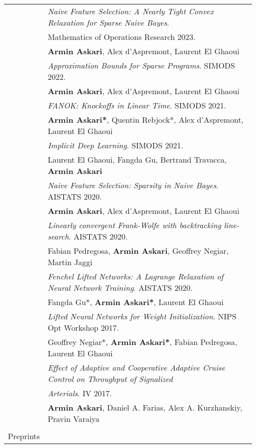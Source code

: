 \documentclass[letterpaper,10pt,oneside]{article}
\begin{document}
\begin{tabular}{@{} l l}
     &  \textit{Naive Feature Selection: A Nearly Tight Convex Relaxation for Sparse Naive Bayes}. \\
     & Mathematics of Operations Research 2023. \\
      & \indent \small{\textbf{Armin Askari}, Alex d'Aspremont, Laurent El Ghaoui}\\
     &  \textit{Approximation Bounds for Sparse Programs}. SIMODS 2022. \\
      & \indent \small{\textbf{Armin Askari}, Alex d'Aspremont, Laurent El Ghaoui}\\
 		&  \textit{FANOK: Knockoffs in Linear Time}. SIMODS  2021. \\
      & \indent \small{\textbf{Armin Askari*}, Quentin Rebjock*, Alex d'Aspremont, Laurent El Ghaoui}\\
       &  \textit{Implicit Deep Learning}. SIMODS  2021. \\
      & \indent \small{Laurent El Ghaoui, Fangda Gu, Bertrand Travacca, \textbf{Armin Askari}}\\
      &  \textit{Naive Feature Selection: Sparsity in Naive Bayes}. AISTATS 2020. \\
      & \indent \small{\textbf{Armin Askari},  Alex d'Aspremont, Laurent El Ghaoui}\\
      &  \textit{Linearly convergent Frank-Wolfe with backtracking line-search}. AISTATS 2020. \\
      & \indent \small{Fabian Pedregosa, \textbf{Armin Askari},  Geoffrey Negiar, Martin Jaggi}\\
            &  \textit{Fenchel Lifted Networks: A Lagrange Relaxation of Neural Network Training}. AISTATS 2020. \\
      & \indent  Fangda Gu*, \small{\textbf{Armin Askari*}, Laurent El Ghaoui}\\     
     & \textit{Lifted Neural Networks for Weight Initialization}. NIPS Opt Workshop 2017. \\
      & \indent \small{Geoffrey Negiar*, \textbf{Armin Askari*},  Fabian Pedregosa, Laurent El Ghaoui}\\
      & \textit{Effect of Adaptive and Cooperative Adaptive Cruise Control on Throughput of Signalized} \\
      & \textit{Arterials}. IV 2017. \\
      & \indent \small{\textbf{Armin Askari},  Daniel A. Farias, Alex A. Kurzhanskiy, Pravin Varaiya}\\
            &\\
\Large{Preprints}

\end{tabular}
\end{document}

